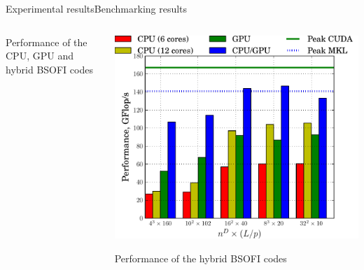 \documentclass[xcolor=table,final]{beamer} %
\begin{document}
\begin{frame}{Experimental results}{Benchmarking results}
\begin{columns}[t]
\begin{column}[t]{0.5\textwidth}
    {Performance of the CPU, GPU and hybrid BSOFI codes}
  \end{column}
  \begin{column}[t]{0.5\textwidth}
    \centering
    \includegraphics[width=\textwidth]{./figs/pdf/BSOFI_performance_sustainability}

    Performance of the hybrid BSOFI codes
  \end{column}
\end{columns}

\end{frame}


\end{document}
